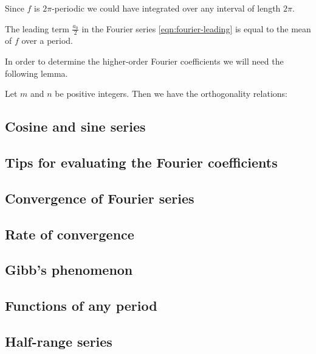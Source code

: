 \begin{remark}
Since $f$ is $2\pi$-periodic we could have integrated over any interval of length $2\pi$.
\end{remark}

\begin{remark}
The leading term $\frac{a_0}{2}$ in the Fourier series \cref{eqn:fourier-leading} is equal to the mean of $f$ over a period.
\end{remark}

In order to determine the higher-order Fourier coefficients we will need the following lemma.

\begin{lemma}
Let $m$ and $n$ be positive integers. Then we have the orthogonality relations:

\end{lemma}


\subsection{Cosine and sine series}
\subsection{Tips for evaluating the Fourier coefficients}
\subsection{Convergence of Fourier series}
\subsection{Rate of convergence}
\subsection{Gibb's phenomenon}
\subsection{Functions of any period}
\subsection{Half-range series}


